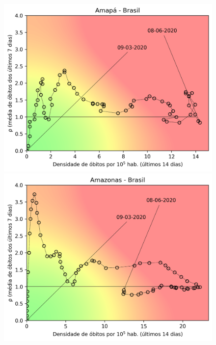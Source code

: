 \documentclass[]{article}
\begin{document}
\begin{figure}[!h]
	\begin{minipage}[t]{4cm}
		\centering
		\includegraphics[scale=0.5]{../AP.png}
	\end{minipage}
	\hspace{5cm}
	\begin{minipage}[t]{4cm}
		\centering
		\includegraphics[scale=0.5]{../AM.png}
		\vspace{0.2cm}
	\end{minipage}


\end{figure}
\end{document}
